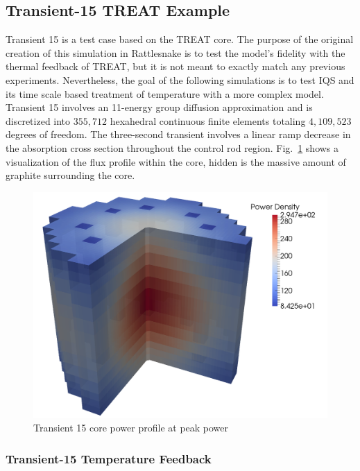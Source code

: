 \documentclass{anstrans}
\newcommand{\fig}[1]{Fig.~\ref{#1}}                      %
\begin{document}
\subsection{Transient-15 TREAT Example}

Transient 15 is a test case based on the TREAT core. The purpose of the original creation of this simulation in Rattlesnake is to test the model's fidelity with the thermal feedback of TREAT, but it is not meant to exactly match any previous experiments.  Nevertheless, the goal of the following simulations is to test IQS and its time scale based treatment of temperature with a more complex model. Transient 15 involves an 11-energy group diffusion approximation and is discretized into $355,712$ hexahedral continuous finite elements totaling $4,109,523$ degrees of freedom.  The three-second transient involves a linear ramp decrease in the absorption cross section throughout the control rod region. \fig{fig:Tran15} shows a visualization of the flux profile within the core, hidden is the massive amount of graphite surrounding the core.   

\begin{figure}[htbp!]
\centering
\includegraphics[width=\linewidth]{Tran15_core2.png}
\caption{Transient 15 core power profile at peak power}
\label{fig:Tran15}
\end{figure}


\subsubsection{Transient-15 Temperature Feedback}
\end{document}
